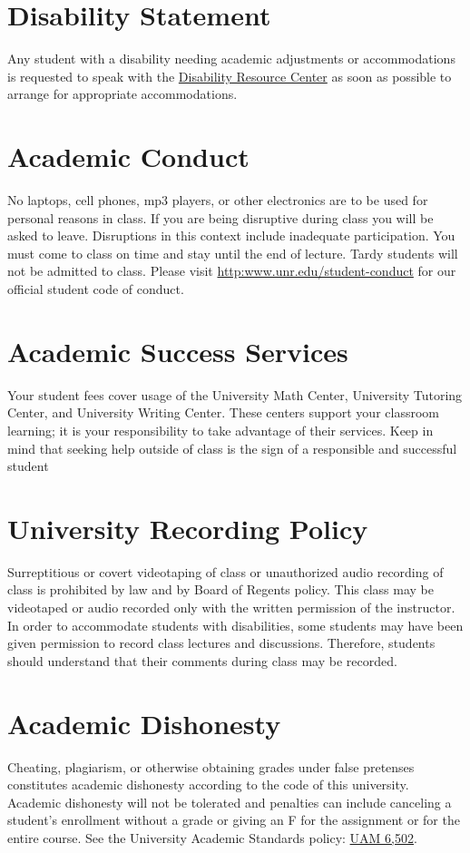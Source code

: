 \documentclass[11pt,onecolumn]{article}
\begin{document}
\section*{Disability Statement}
Any student with a disability needing academic adjustments or accommodations is requested to speak with the \href{http:www.unr.edu/drc}{Disability Resource Center} as soon as possible to arrange for appropriate accommodations.

\section*{Academic Conduct}
No laptops, cell phones, mp3 players, or other electronics are to be used for personal reasons in class. If you are being disruptive during class you will be asked to leave. Disruptions in this context include inadequate participation. You must come to class on time and stay until the end of lecture. Tardy students will not be admitted to class. Please visit \url{http:www.unr.edu/student-conduct} for our official student code of conduct.

\section*{Academic Success Services}
Your student fees cover usage of the University Math Center, University Tutoring Center, and University Writing Center. These centers support your classroom learning; it is your responsibility to take advantage of their services. Keep in mind that seeking help outside of class is the sign of a responsible and successful student

\section*{University Recording Policy}
Surreptitious or covert videotaping of class or unauthorized audio recording of class is prohibited by law and by Board of Regents policy. This class may be videotaped or audio recorded only with the written permission of the instructor. In order to accommodate students with disabilities, some students may have been given permission to record class lectures and discussions. Therefore, students should understand that their comments during class may be recorded.

\section*{Academic Dishonesty}
Cheating, plagiarism, or otherwise obtaining grades under false pretenses constitutes academic dishonesty according to the code of this university. Academic dishonesty will not be tolerated and penalties can include canceling a student’s enrollment without a grade or giving an F for the assignment or for the entire course. See the University Academic Standards policy: \href{https://www.unr.edu/administrative-manual/6000-6999-curricula-teaching-research/instruction-research-procedures/6502-academic-standards}{UAM 6,502}.
\end{document}
